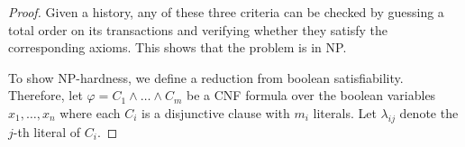 
%
\begin{proof}
 Given a history, any of these three criteria can be checked by guessing a total order on its transactions and verifying whether they satisfy the corresponding axioms. This shows that the problem is in NP.
 
 To show NP-hardness, we define a reduction from boolean satisfiability. Therefore, let $\varphi=C_1\land\ldots\land C_m$ be a \textsf{CNF} formula over the boolean variables $x_1, \ldots, x_n$ where each $C_i$ is a disjunctive clause with $m_i$ literals.  %
 Let $\lambda_{ij}$ denote the $j$-th literal of $C_i$. 
 

\end{proof}
